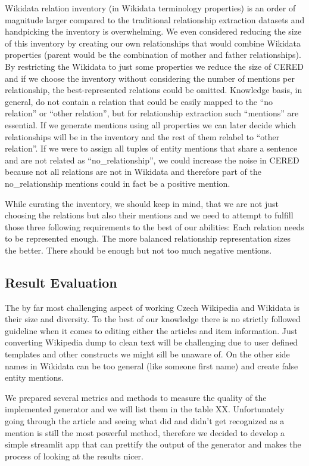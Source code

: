 Wikidata relation inventory (in Wikidata terminology properties) is an order of magnitude larger compared to the traditional relationship extraction datasets and handpicking the inventory is overwhelming. We even considered reducing the size of this inventory by creating our own relationships that would combine Wikidata properties (parent would be the combination of mother and father relationships). 
By restricting the Wikidata to just some properties we reduce the size of CERED and if we choose the inventory without considering the number of mentions per relationship, the best-represented relations could be omitted.
Knowledge basis, in general, do not contain a relation that could be easily mapped to the “no relation” or “other relation”, but for relationship extraction such “mentions” are essential. If we generate mentions using all properties we can later decide which relationships will be in the inventory and the rest of them relabel to “other relation”. If we were to assign all tuples of entity mentions that share a sentence and are not related as “no\_relationship”, we could increase the noise in CERED because not all relations are not in Wikidata and therefore part of the no\_relationship mentions could in fact be a positive mention.

While curating the inventory, we should keep in mind, that we are not just choosing the relations but also their mentions and we need to attempt to fulfill those three following requirements to the best of our abilities:
Each relation needs to be represented enough.
The more balanced relationship representation sizes the better.
There should be enough but not too much negative mentions.

\subsection{Result Evaluation}
The by far most challenging aspect of working Czech Wikipedia and Wikidata is their size and diversity. To the best of our knowledge there is no strictly followed guideline when it comes to editing either the articles and item information. Just converting Wikipedia dump to clean text will be challenging due to user defined templates and other constructs we might sill be unaware of. On the other side names in Wikidata can be too general (like someone first name) and create false entity mentions. 

We prepared several metrics and methods to measure the quality of the implemented generator and we will list them in the table XX. Unfortunately going through the article and seeing what did and didn’t get recognized as a mention is still the most powerful method, therefore we decided to develop a simple streamlit app that can prettify the output of the generator and makes the process of looking at the results nicer. 

